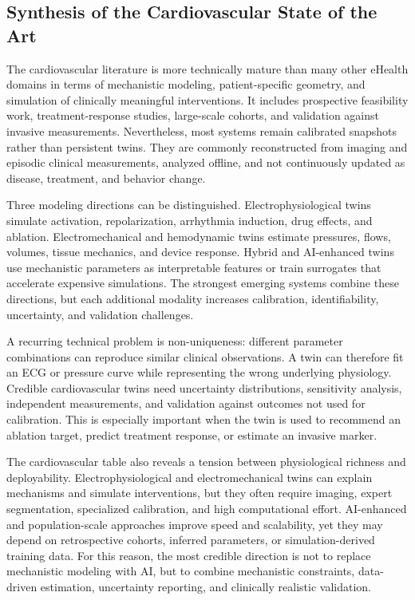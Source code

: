 \subsection{Synthesis of the Cardiovascular State of the Art}
The cardiovascular literature is more technically mature than many other eHealth domains in terms of mechanistic modeling, patient-specific geometry, and simulation of clinically meaningful interventions. It includes prospective feasibility work, treatment-response studies, large-scale cohorts, and validation against invasive measurements. Nevertheless, most systems remain calibrated snapshots rather than persistent twins. They are commonly reconstructed from imaging and episodic clinical measurements, analyzed offline, and not continuously updated as disease, treatment, and behavior change.

Three modeling directions can be distinguished. Electrophysiological twins simulate activation, repolarization, arrhythmia induction, drug effects, and ablation. Electromechanical and hemodynamic twins estimate pressures, flows, volumes, tissue mechanics, and device response. Hybrid and AI-enhanced twins use mechanistic parameters as interpretable features or train surrogates that accelerate expensive simulations. The strongest emerging systems combine these directions, but each additional modality increases calibration, identifiability, uncertainty, and validation challenges.

A recurring technical problem is non-uniqueness: different parameter combinations can reproduce similar clinical observations. A twin can therefore fit an ECG or pressure curve while representing the wrong underlying physiology. Credible cardiovascular twins need uncertainty distributions, sensitivity analysis, independent measurements, and validation against outcomes not used for calibration. This is especially important when the twin is used to recommend an ablation target, predict treatment response, or estimate an invasive marker.

The cardiovascular table also reveals a tension between physiological richness and deployability. Electrophysiological and electromechanical twins can explain mechanisms and simulate interventions, but they often require imaging, expert segmentation, specialized calibration, and high computational effort. AI-enhanced and population-scale approaches improve speed and scalability, yet they may depend on retrospective cohorts, inferred parameters, or simulation-derived training data. For this reason, the most credible direction is not to replace mechanistic modeling with AI, but to combine mechanistic constraints, data-driven estimation, uncertainty reporting, and clinically realistic validation.

